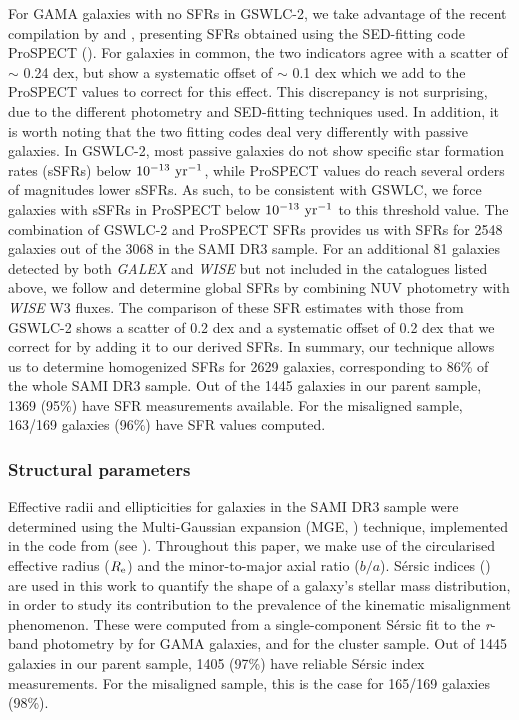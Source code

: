 \documentclass[fleqn,usenatbib]{mnras}
\begin{document}
For GAMA galaxies with no SFRs in GSWLC-2, we take advantage of the recent compilation by \cite{Bellstedt2020} and \cite{Driver2022}, presenting SFRs obtained using the SED-fitting code ProSPECT (\citealt{Robotham2020prospect}). For galaxies in common, the two indicators agree with a scatter of $\sim$ 0.24 dex, but show a systematic offset of $\sim$ 0.1 dex which we add to the ProSPECT values to correct for this effect. This discrepancy is not surprising, due to the different photometry and SED-fitting techniques used. In addition, it is worth noting that the two fitting codes deal very differently with passive galaxies. In GSWLC-2, most passive galaxies do not show specific star formation rates (sSFRs) below $10^{-13}\ \rm{yr^{-1}}$, while ProSPECT values do reach several orders of magnitudes lower sSFRs. As such, to be consistent with GSWLC, we force galaxies with sSFRs in ProSPECT below $10^{-13}\ \rm{yr^{-1}}$ to this threshold value. The combination of GSWLC-2 and ProSPECT SFRs provides us with SFRs for 2548 galaxies out of the 3068 in the SAMI DR3 sample.
For an additional 81 galaxies detected by both \textit{GALEX} and \textit{WISE} but not included in the catalogues listed above, we follow \cite{Janowiecki2017} and determine global SFRs by combining NUV photometry with \textit{WISE} W3 fluxes. The comparison of these SFR estimates with those from GSWLC-2 shows a scatter of 0.2 dex and a systematic offset of 0.2 dex that we correct for by adding it to our derived SFRs.
In summary, our technique allows us to determine homogenized SFRs for 2629 galaxies, corresponding to 86\% of the whole SAMI DR3 sample. Out of the 1445 galaxies in our parent sample, 1369 (95\%) have SFR measurements available. For the misaligned sample, 163/169 galaxies (96\%) have SFR values computed.

\subsubsection{Structural parameters }
\label{structural_param}

Effective radii and ellipticities for galaxies in the SAMI DR3 sample were determined using the Multi-Gaussian expansion (MGE, \citealt*{Emsellem1994}) technique, implemented in the code from \cite{Capellari2002} (see \citealt{Deugenio2021}). Throughout this paper, we make use of the circularised effective radius ($R_{\rm{e}}$) and the minor-to-major axial ratio ($b/a$). S\'ersic indices (\citealt{Sersic1963}) are used in this work to quantify the shape of a galaxy's stellar mass distribution, in order to study its contribution to the prevalence of the kinematic misalignment phenomenon. These were computed from a single-component S\'ersic fit to the \textit{r}-band photometry by \cite{Lee2012} for GAMA galaxies, and \cite{Owers2019} for the cluster sample. Out of 1445 galaxies in our parent sample, 1405 (97\%) have reliable S\'ersic index measurements. For the misaligned sample, this is the case for 165/169 galaxies (98\%).
\end{document}
